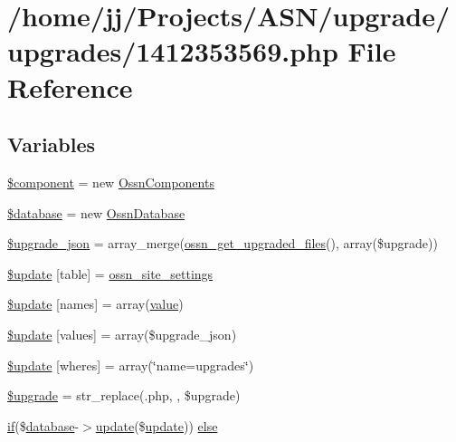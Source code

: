 \hypertarget{1412353569_8php}{}\section{/home/jj/\+Projects/\+A\+S\+N/upgrade/upgrades/1412353569.php File Reference}
\label{1412353569_8php}
\subsection*{Variables}
\begin{DoxyCompactItemize}
\item 
\hyperlink{1412353569_8php_a211527c21ba56109545060b49b628e59}{\$component} = new \hyperlink{class_ossn_components}{Ossn\+Components}
\item 
\hyperlink{1412353569_8php_a7691c0162d89de0b6ba47edcd8ba8878}{\$database} = new \hyperlink{class_ossn_database}{Ossn\+Database}
\item 
\hyperlink{1412353569_8php_a512525d0f5eb608ac72ca7b85e5fbf65}{\$upgrade\+\_\+json} = array\+\_\+merge(\hyperlink{ossn_8lib_8upgrade_8php_a984d0f1ee4273d739939d28d00a8bedb}{ossn\+\_\+get\+\_\+upgraded\+\_\+files}(), array(\$upgrade))
\item 
\hyperlink{1412353569_8php_aee7ba5985ddf023a93862ab77e9718f9}{\$update} \mbox{[}\textquotesingle{}table\textquotesingle{}\mbox{]} = \textquotesingle{}\hyperlink{ossn_8lib_8system_8php_a610e2045b8a86c09f777b4d82e24e34c}{ossn\+\_\+site\+\_\+settings}\textquotesingle{}
\item 
\hyperlink{1412353569_8php_abcf5ad2e4fef35de04bef0168cc91ddc}{\$update} \mbox{[}\textquotesingle{}names\textquotesingle{}\mbox{]} = array(\textquotesingle{}\hyperlink{fullpage_2plugin_8min_8js_ac56c57897e10f699d124e0103921aa20}{value}\textquotesingle{})
\item 
\hyperlink{1412353569_8php_ac82a75b4c6df37380ff77c88f041785e}{\$update} \mbox{[}\textquotesingle{}values\textquotesingle{}\mbox{]} = array(\$upgrade\+\_\+json)
\item 
\hyperlink{1412353569_8php_aacde4479a904b32d0f24dea4e01f148c}{\$update} \mbox{[}\textquotesingle{}wheres\textquotesingle{}\mbox{]} = array(\char`\"{}name=\textquotesingle{}upgrades\textquotesingle{}\char`\"{})
\item 
\hyperlink{1412353569_8php_a9084097ce600d3cc7a79a20ecaea9906}{\$upgrade} = str\+\_\+replace(\textquotesingle{}.php\textquotesingle{}, \textquotesingle{}\textquotesingle{}, \$upgrade)
\item 
\hyperlink{jquery_8tokeninput_8js_ad8dd46a3cbc004569e34401e9e71771a}{if}(\$\hyperlink{ossn_8config_8db_8example_8php_a4e0ca996705612048240f76ff8d4da95}{database}-\/$>$\hyperlink{_chart_8_doughnut_8js_ad58a8121caa8678969d1ff32848a77c4}{update}(\$\hyperlink{_chart_8_doughnut_8js_ad58a8121caa8678969d1ff32848a77c4}{update})) \hyperlink{1412353569_8php_aa7c58ee9f19ec0c0f3a1951839273e79}{else}
\end{DoxyCompactItemize}


